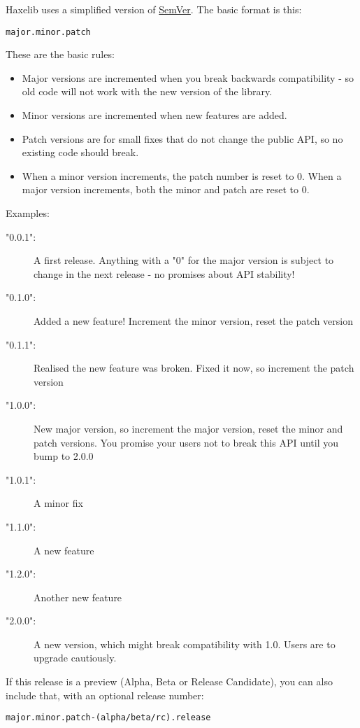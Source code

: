 Haxelib uses a simplified version of \href{http://semver.org/}{SemVer}. The basic format is this:

\begin{lstlisting}
major.minor.patch
\end{lstlisting}

These are the basic rules:

\begin{itemize}
	\item Major versions are incremented when you break backwards compatibility - so old code will not work with the new version of the library.
	\item Minor versions are incremented when new features are added.
	\item Patch versions are for small fixes that do not change the public API, so no existing code should break.
	\item When a minor version increments, the patch number is reset to 0. When a major version increments, both the minor and patch are reset to 0.
\end{itemize}

Examples:

\begin{description}
\item["0.0.1":] A first release.  Anything with a "0" for the major version is subject to change in the next release - no promises about API stability!
\item["0.1.0":] Added a new feature!   Increment the minor version, reset the patch version
\item["0.1.1":] Realised the new feature was broken.  Fixed it now, so increment the patch version
\item["1.0.0":] New major version, so increment the major version, reset the minor and patch versions.   You promise your users not to break this API until you bump to 2.0.0
\item["1.0.1":] A minor fix
\item["1.1.0":] A new feature
\item["1.2.0":] Another new feature
\item["2.0.0":] A new version, which might break compatibility with 1.0.  Users are to upgrade cautiously.
\end{description}

If this release is a preview (Alpha, Beta or Release Candidate), you can also include that, with an optional release number:

\begin{lstlisting}
major.minor.patch-(alpha/beta/rc).release
\end{lstlisting}

